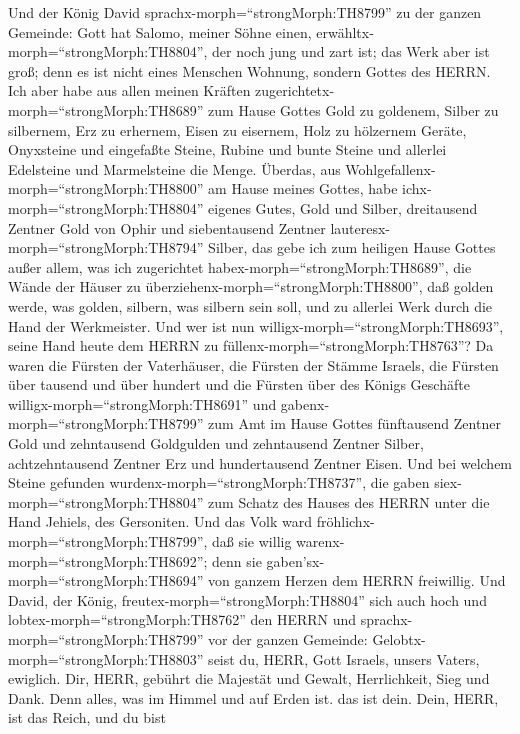  Und der König David sprachx-morph=``strongMorph:TH8799'' zu
der ganzen Gemeinde: Gott hat Salomo, meiner Söhne einen,
erwähltx-morph=``strongMorph:TH8804'', der noch jung und zart ist; das
Werk aber ist groß; denn es ist nicht eines Menschen Wohnung, sondern
Gottes des HERRN.  Ich aber habe aus allen meinen Kräften
zugerichtetx-morph=``strongMorph:TH8689'' zum Hause Gottes Gold zu
goldenem, Silber zu silbernem, Erz zu erhernem, Eisen zu eisernem, Holz
zu hölzernem Geräte, Onyxsteine und eingefaßte Steine, Rubine und bunte
Steine und allerlei Edelsteine und Marmelsteine die Menge. 
Überdas, aus Wohlgefallenx-morph=``strongMorph:TH8800'' am Hause meines
Gottes, habe ichx-morph=``strongMorph:TH8804'' eigenes Gutes, Gold und
Silber,  dreitausend Zentner Gold von Ophir und
siebentausend Zentner lauteresx-morph=``strongMorph:TH8794'' Silber, das
gebe ich zum heiligen Hause Gottes außer allem, was ich zugerichtet
habex-morph=``strongMorph:TH8689'', die Wände der Häuser zu
überziehenx-morph=``strongMorph:TH8800'',  daß golden werde,
was golden, silbern, was silbern sein soll, und zu allerlei Werk durch
die Hand der Werkmeister. Und wer ist nun
willigx-morph=``strongMorph:TH8693'', seine Hand heute dem HERRN zu
füllenx-morph=``strongMorph:TH8763''?  Da waren die Fürsten
der Vaterhäuser, die Fürsten der Stämme Israels, die Fürsten über
tausend und über hundert und die Fürsten über des Königs Geschäfte
willigx-morph=``strongMorph:TH8691''  und
gabenx-morph=``strongMorph:TH8799'' zum Amt im Hause Gottes fünftausend
Zentner Gold und zehntausend Goldgulden und zehntausend Zentner Silber,
achtzehntausend Zentner Erz und hundertausend Zentner Eisen.
 Und bei welchem Steine gefunden
wurdenx-morph=``strongMorph:TH8737'', die gaben
siex-morph=``strongMorph:TH8804'' zum Schatz des Hauses des HERRN unter
die Hand Jehiels, des Gersoniten.  Und das Volk ward
fröhlichx-morph=``strongMorph:TH8799'', daß sie willig
warenx-morph=``strongMorph:TH8692''; denn sie
gaben'sx-morph=``strongMorph:TH8694'' von ganzem Herzen dem HERRN
freiwillig. Und David, der König, freutex-morph=``strongMorph:TH8804''
sich auch hoch  und lobtex-morph=``strongMorph:TH8762'' den
HERRN und sprachx-morph=``strongMorph:TH8799'' vor der ganzen Gemeinde:
Gelobtx-morph=``strongMorph:TH8803'' seist du, HERR, Gott Israels,
unsers Vaters, ewiglich.  Dir, HERR, gebührt die Majestät
und Gewalt, Herrlichkeit, Sieg und Dank. Denn alles, was im Himmel und
auf Erden ist. das ist dein. Dein, HERR, ist das Reich, und du bist
